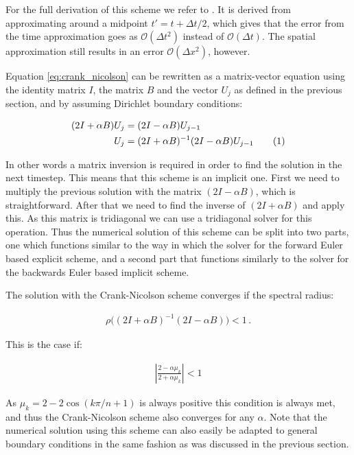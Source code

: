 \documentclass[reprint,english,notitlepage]{revtex4-1}  %
\newcommand\numberthis{\addtocounter{equation}{1}\tag{\theequation}}
\begin{document}
For the full derivation of this scheme we refer to \cite[p.~311]{Hjorth-Jensen2015}. It is derived from approximating around a midpoint $t' = t + \Delta t/2$, which gives that the error from the time approximation goes as $\mathcal{O}(\Delta t^2)$ instead of $\mathcal{O}(\Delta t)$. The spatial approximation still results in an error $\mathcal{O}(\Delta x^2)$, however.

Equation \eqref{eq:crank_nicolson} can be rewritten as a matrix-vector equation using the identity matrix $I$, the matrix $B$ and the vector $U_j$ as defined in the previous section, and by assuming Dirichlet boundary conditions:

\begin{align*}
(2I + \alpha B ) U_j &= (2I - \alpha B) U_{j-1} \\
U_j &= (2I + \alpha B)^{-1} (2I - \alpha B) U_{j-1} \numberthis \label{eq:crank_nicolson_matrix}
\end{align*}

In other words a matrix inversion is required in order to find the solution in the next timestep. This means that this scheme is an implicit one. First we need to multiply the previous solution with the matrix $(2I - \alpha B)$, which is straightforward. After that we need to find the inverse of $(2I + \alpha B)$ and apply this. As this matrix is tridiagonal we can use a tridiagonal solver for this operation. Thus the numerical solution of this scheme can be split into two parts, one which functions similar to the way in which the solver for the forward Euler based explicit scheme, and a second part that functions similarly to the solver for the backwards Euler based implicit scheme.

The solution with the Crank-Nicolson scheme converges if the spectral radius:

\begin{align*}
\rho\bigg( (2I + \alpha B)^{-1} (2I - \alpha B) \bigg) < 1 \, .
\end{align*}

This is the case if:

\begin{align*}
| \frac{2 - \alpha \mu_k}{2 + \alpha \mu_k} | < 1
\end{align*}

As $\mu_k = 2 - 2 \cos(k\pi/n + 1)$ is always positive this condition is always met, and thus the Crank-Nicolson scheme also converges for any $\alpha$. Note that the numerical solution using this scheme can also easily be adapted to general boundary conditions in the same fashion as was discussed in the previous section.
\end{document}

